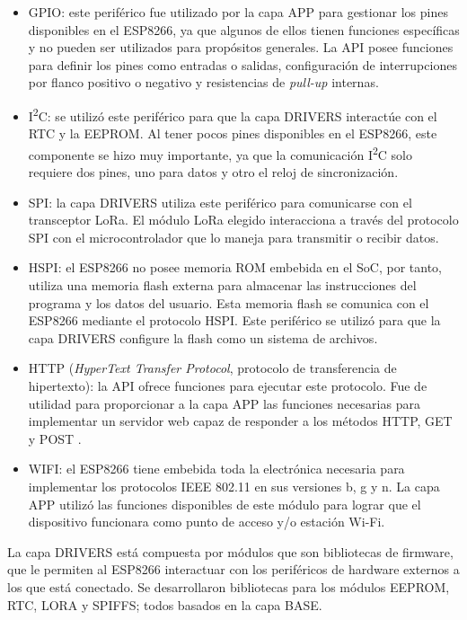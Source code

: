 \begin{itemize}
	\item GPIO: este periférico fue utilizado por la capa APP para gestionar los pines disponibles en el ESP8266, ya que algunos de ellos tienen funciones específicas y no pueden ser utilizados para propósitos generales. La API posee funciones para definir los pines como entradas o salidas, configuración de interrupciones por flanco positivo o negativo y resistencias de \textit{pull-up} internas.
	\item I\textsuperscript{2}C: se utilizó este periférico para que la capa DRIVERS interactúe con el RTC y la EEPROM. Al tener pocos pines disponibles en el ESP8266, este componente se hizo muy importante, ya que la comunicación I\textsuperscript{2}C solo requiere dos pines, uno para datos y otro el reloj de sincronización.
	\item SPI: la capa DRIVERS utiliza este periférico para comunicarse con el transceptor LoRa. El módulo LoRa elegido interacciona a través del protocolo SPI con el microcontrolador que lo maneja para transmitir o recibir datos.
	\item HSPI: el ESP8266 no posee memoria ROM embebida en el SoC, por tanto, utiliza una memoria flash externa para almacenar las instrucciones del programa y los datos del usuario. Esta memoria flash se comunica con el ESP8266 mediante el protocolo HSPI. Este periférico se utilizó para que la capa DRIVERS configure la flash como un sistema de archivos.
	\item HTTP (\textit{HyperText Transfer Protocol}, protocolo de transferencia de hipertexto): la API ofrece funciones para ejecutar este protocolo. Fue de utilidad para proporcionar a la capa APP las funciones necesarias para implementar un servidor web capaz de responder a los métodos HTTP, GET y POST \citep{WEBSITE:20}.
	\item WIFI: el ESP8266 tiene embebida toda la electrónica necesaria para implementar los protocolos IEEE 802.11 en sus versiones b, g y n. La capa APP utilizó las funciones disponibles de este módulo para lograr que el dispositivo funcionara como punto de acceso y/o estación Wi-Fi.
\end{itemize}

La capa DRIVERS está compuesta por módulos que son bibliotecas de firmware, que le permiten al ESP8266 interactuar con los periféricos de hardware externos a los que está conectado. Se desarrollaron bibliotecas para los módulos EEPROM, RTC, LORA y SPIFFS; todos basados en la capa BASE.

